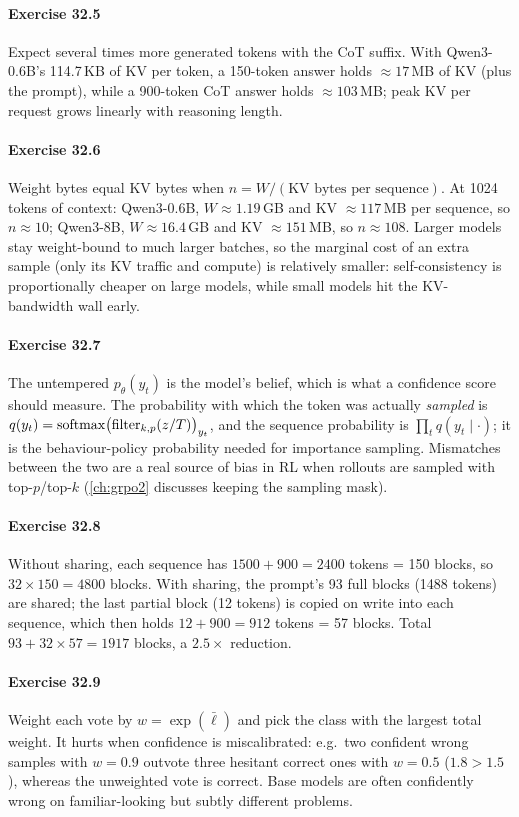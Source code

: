 \paragraph{Exercise 32.5} Expect several times more generated tokens with the CoT suffix. With
Qwen3-0.6B's 114.7\,KB of KV per token, a 150-token answer holds $\approx 17$\,MB of KV (plus the
prompt), while a 900-token CoT answer holds $\approx 103$\,MB; peak KV per request grows linearly
with reasoning length.

\paragraph{Exercise 32.6} Weight bytes equal KV bytes when
$n = W / (\text{KV bytes per sequence})$. At 1024 tokens of context: Qwen3-0.6B,
$W \approx 1.19$\,GB and KV $\approx 117$\,MB per sequence, so $n \approx 10$; Qwen3-8B,
$W \approx 16.4$\,GB and KV $\approx 151$\,MB, so $n \approx 108$. Larger models stay weight-bound to
much larger batches, so the marginal cost of an extra sample (only its KV traffic and compute) is
relatively smaller: self-consistency is proportionally cheaper on large models, while small models
hit the KV-bandwidth wall early.

\paragraph{Exercise 32.7} The untempered $p_\theta(y_t)$ is the model's belief, which is what a
confidence score should measure. The probability with which the token was actually \emph{sampled}
is $q(y_t) = \operatorname{softmax}\bigl(\mathrm{filter}_{k,p}(z/T)\bigr)_{y_t}$, and the sequence probability is
$\prod_t q(y_t \mid \cdot)$; it is the behaviour-policy probability needed for importance sampling.
Mismatches between the two are a real source of bias in RL when rollouts are sampled with
top-$p$/top-$k$ (\cref{ch:grpo2} discusses keeping the sampling mask).

\paragraph{Exercise 32.8} Without sharing, each sequence has $1500 + 900 = 2400$ tokens = 150 blocks,
so $32 \times 150 = 4800$ blocks. With sharing, the prompt's 93 full blocks (1488 tokens) are shared;
the last partial block (12 tokens) is copied on write into each sequence, which then holds
$12 + 900 = 912$ tokens = 57 blocks. Total $93 + 32 \times 57 = 1917$ blocks, a $2.5\times$
reduction.

\paragraph{Exercise 32.9} Weight each vote by $w = \exp(\bar\ell)$ and pick the class with the
largest total weight. It hurts when confidence is miscalibrated: e.g.\ two confident wrong samples
with $w = 0.9$ outvote three hesitant correct ones with $w = 0.5$ ($1.8 > 1.5$), whereas the
unweighted vote is correct. Base models are often confidently wrong on familiar-looking but
subtly different problems.
